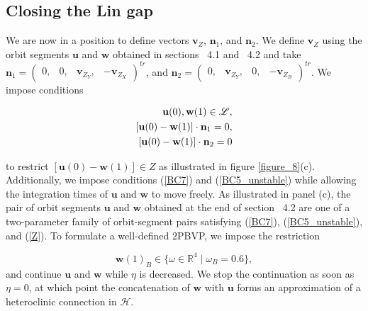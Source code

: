 \documentclass{ws-ijbc}
\begin{document}
\subsection{Closing the Lin gap}

We are now in a position to define vectors $\mathbf{v}_Z$, $\mathbf{n}_1$, and $\mathbf{n}_2$.  We define $\mathbf{v}_Z$ using the orbit segments $\mathbf{u}$ and $\mathbf{w}$ obtained in sections ~4.1 and ~4.2 and take $\mathbf{n}_1 = \begin{pmatrix} 0, & 0, & \mathbf{v}_{Z_Y}, & -\mathbf{v}_{Z_X} \end{pmatrix}^{tr}$, and $\mathbf{n}_2 = \begin{pmatrix} 0, & \mathbf{v}_{Z_Y}, & 0, & -\mathbf{v}_{Z_B} \end{pmatrix}^{tr}$.  We impose conditions

\begin{align}
	\begin{split}
		\mathbf{u}(0), \mathbf{w}(1) \in \mathscr{L},\\ \vspace{2mm}
		[\mathbf{u}(0) - \mathbf{w}(1)] \cdot \mathbf{n}_1 =0, \\ \vspace{2mm}
		[\mathbf{u}(0) - \mathbf{w}(1)] \cdot \mathbf{n}_2 =0
	\end{split}
	\label{Z}
\end{align}

\noindent
to restrict $[\mathbf{u}(0) -\mathbf{w}(1)] \in Z$ as illustrated in figure \ref{figure_8}(c).  Additionally, we impose conditions (\ref{BC7}) and (\ref{BC5_unstable}) while allowing the integration times of $\mathbf{u}$ and $\mathbf{w}$ to move freely.  As illustrated in panel (c), the pair of orbit segments $\mathbf{u}$ and $\mathbf{w}$ obtained at the end of section ~4.2 are one of a two-parameter family of orbit-segment pairs satisfying (\ref{BC7}), (\ref{BC5_unstable}), and (\ref{Z}).  To formulate a well-defined 2PBVP, we impose the restriction

\begin{equation}
\mathbf{w}(1)_B \in \{ \omega \in \mathbb{R}^4 \; | \; \omega_B = 0.6 \},
\label{fix_B}
\end{equation}  
\noindent
and continue $\mathbf{u}$ and $\mathbf{w}$ while $\eta$ is decreased.  We stop the continuation as soon as $\eta = 0$, at which point the concatenation of $\mathbf{w}$ with $\mathbf{u}$ forms an approximation of a heteroclinic connection in $\mathscr{H}$.
\end{document}
